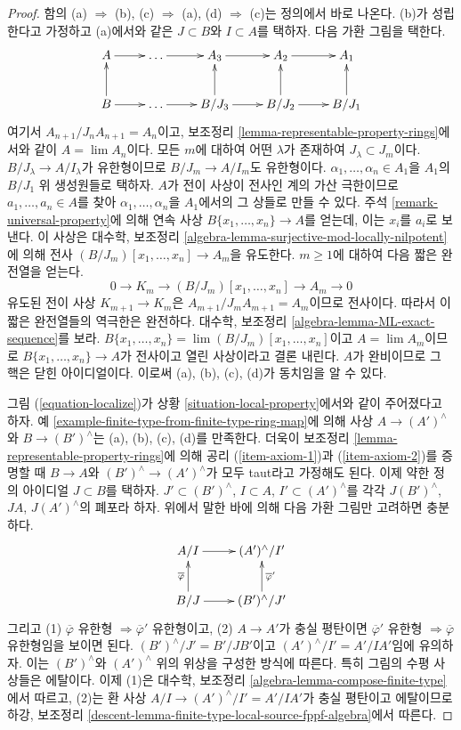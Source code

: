 \begin{proof}
함의 (a) $\Rightarrow$ (b), (c) $\Rightarrow$ (a),
(d) $\Rightarrow$ (c)는 정의에서 바로 나온다. (b)가 성립한다고
가정하고 (a)에서와 같은 $J \subset B$와 $I \subset A$를 택하자.
다음 가환 그림을 택한다.
$$
\xymatrix{
A \ar[r] & \ldots \ar[r] & A_3 \ar[r] & A_2 \ar[r] & A_1 \\
B \ar[r] \ar[u] & \ldots \ar[r] & B/J_3 \ar[r] \ar[u] &
B/J_2 \ar[r] \ar[u] & B/J_1 \ar[u]
}
$$
여기서 $A_{n + 1}/J_nA_{n + 1} = A_n$이고, 보조정리
\ref{lemma-representable-property-rings}에서와 같이
$A = \lim A_n$이다. 모든 $m$에 대하여 어떤 $\lambda$가 존재하여
$J_\lambda \subset J_m$이다. $B/J_\lambda \to A/I_\lambda$가 유한형이므로
$B/J_m \to A/I_m$도 유한형이다. $\alpha_1, \ldots, \alpha_n \in A_1$을
$A_1$의 $B/J_1$ 위 생성원들로 택하자. $A$가 전이 사상이 전사인
계의 가산 극한이므로 $a_1, \ldots, a_n \in A$를 찾아
$\alpha_1, \ldots, \alpha_n$을 $A_1$에서의 그 상들로 만들 수 있다. 주석
\ref{remark-universal-property}에 의해 연속 사상
$B\{x_1, \ldots, x_n\} \to A$를 얻는데, 이는 $x_i$를 $a_i$로 보낸다. 이 사상은 대수학, 보조정리
\ref{algebra-lemma-surjective-mod-locally-nilpotent}에 의해 전사
$(B/J_m)[x_1, \ldots, x_n] \to A_m$을 유도한다. $m \geq 1$에 대하여
다음 짧은 완전열을 얻는다.
$$
0 \to K_m \to (B/J_m)[x_1, \ldots, x_n] \to A_m \to 0
$$
유도된 전이 사상 $K_{m + 1} \to K_m$은
$A_{m + 1}/J_mA_{m + 1} = A_m$이므로 전사이다. 따라서 이 짧은 완전열들의 역극한은
완전하다. 대수학, 보조정리 \ref{algebra-lemma-ML-exact-sequence}를 보라.
$B\{x_1, \ldots, x_n\} = \lim (B/J_m)[x_1, \ldots, x_n]$이고
$A = \lim A_m$이므로 $B\{x_1, \ldots, x_n\} \to A$가 전사이고
열린 사상이라고 결론 내린다. $A$가 완비이므로 그 핵은 닫힌
아이디얼이다. 이로써 (a), (b), (c), (d)가 동치임을 알 수 있다.

\medskip\noindent
그림 (\ref{equation-localize})가 상황
\ref{situation-local-property}에서와 같이 주어졌다고 하자. 예
\ref{example-finite-type-from-finite-type-ring-map}에 의해 사상
$A \to (A')^\wedge$와 $B \to (B')^\wedge$는 (a), (b), (c), (d)를
만족한다. 더욱이 보조정리 \ref{lemma-representable-property-rings}에 의해
공리 (\ref{item-axiom-1})과 (\ref{item-axiom-2})를 증명할 때
$B \to A$와 $(B')^\wedge \to (A')^\wedge$가 모두 taut라고 가정해도 된다.
이제 약한 정의 아이디얼 $J \subset B$를 택하자.
$J' \subset (B')^\wedge$, $I \subset A$, $I' \subset (A')^\wedge$를
각각 $J(B')^\wedge$, $JA$, $J(A')^\wedge$의 폐포라 하자.
위에서 말한 바에 의해 다음 가환 그림만 고려하면 충분하다.
$$
\xymatrix{
A/I \ar[r] & (A')^\wedge/I' \\
B/J \ar[r] \ar[u]^{\overline{\varphi}} &
(B')^\wedge/J' \ar[u]_{\overline{\varphi}'}
}
$$
그리고 (1) $\overline{\varphi}$ 유한형
$\Rightarrow \overline{\varphi}'$ 유한형이고, (2) $A \to A'$가 충실
평탄이면 $\overline{\varphi}'$ 유한형
$\Rightarrow \overline{\varphi}$ 유한형임을
보이면 된다. $(B')^\wedge/J' = B'/JB'$이고
$(A')^\wedge/I' = A'/IA'$임에 유의하자. 이는 $(B')^\wedge$와
$(A')^\wedge$ 위의 위상을 구성한 방식에 따른다.
특히 그림의 수평 사상들은 에탈이다. 이제 (1)은 대수학, 보조정리
\ref{algebra-lemma-compose-finite-type}에서 따르고, (2)는 환 사상
$A/I \to (A')^\wedge/I' = A'/IA'$가 충실 평탄이고 에탈이므로
하강, 보조정리
\ref{descent-lemma-finite-type-local-source-fppf-algebra}에서 따른다.


\end{proof}
